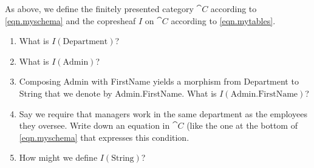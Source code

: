 \documentclass[Book-Poly]{subfiles}
\begin{document}
\begin{exercise} %
As above, we define the finitely presented category $\cat{C}$ according to \eqref{eqn.myschema} and the copresheaf $I$ on $\cat{C}$ according to \eqref{eqn.mytables}.
\begin{enumerate}
    \item What is $I(\text{Department})$?
    \item What is $I(\text{Admin})$?
    \item Composing Admin with FirstName yields a morphism from Department to String that we denote by Admin.FirstName.
    What is $I(\text{Admin.FirstName})$?
    \item Say we require that managers work in the same department as the employees they oversee.
    Write down an equation in $\cat{C}$ (like the one at the bottom of \eqref{eqn.myschema} that expresses this condition.
    \item How might we define $I(\text{String})$? \qedhere
\end{enumerate}


\end{exercise}
\end{document}

